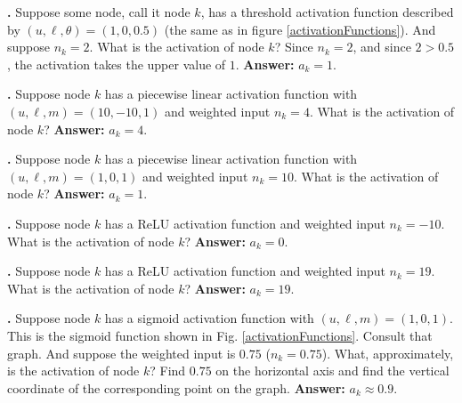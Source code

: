 \bigskip

\noindent
{\bf \theActFunctionCounter.} Suppose some node, call it node $k$, has a threshold 
activation function described by $(u,\ell,\theta) = (1,0,0.5)$ (the same as in 
figure \ref{activationFunctions}). And suppose $n_k = 2$. What is the activation 
of node $k$?  Since $n_k = 2$, and since $2 > 0.5$, the activation takes the 
upper value of $1$. {\bf Answer:} $a_k=1$.

\bigskip

%


\noindent
{\bf \theActFunctionCounter.} Suppose node $k$ has a piecewise linear activation function with $(u,\ell,m) = (10,-10,1)$ and weighted input $n_k = 4$. What is the activation of node $k$? {\bf 
Answer:} $a_k = 4$.

\bigskip

\noindent
{\bf \theActFunctionCounter.} Suppose node $k$ has a piecewise linear activation function with $(u,\ell,m) = (1,0,1)$ and weighted input $n_k = 10$. What is the activation of node $k$? {\bf 
Answer:} $a_k = 1$.

\bigskip

\noindent
{\bf \theActFunctionCounter.} Suppose node $k$ has a ReLU activation function and weighted input $n_k = -10$. What is the activation of node $k$? {\bf 
Answer:} $a_k = 0$.

\bigskip


\noindent
{\bf \theActFunctionCounter.} Suppose node $k$ has a ReLU activation function and weighted input $n_k = 19$. What is the activation of node $k$? {\bf 
Answer:} $a_k = 19$.

\bigskip

\label{actFunctEx3}
\noindent
{\bf \theActFunctionCounter.} Suppose node $k$ has a sigmoid activation function
with $(u,\ell,m) = (1,0,1)$. This is the sigmoid function shown in Fig. 
\ref{activationFunctions}. Consult that graph. And suppose the weighted input is 
$0.75$ ($n_k = 0.75$). What, approximately, is the activation of node $k$?  
Find $0.75$ on the horizontal axis and find the vertical coordinate of the 
corresponding point on the graph. {\bf Answer:} $a_k \approx 0.9$.

